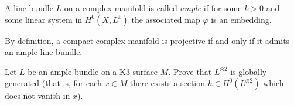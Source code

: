 \begin{definition}
\label{definition-ample}
\begin{reference}
\cite[Definition 2.3.28]{huc}
\end{reference}
A line bundle $L$ on a complex manifold is called {\it ample} if for some $k>0$
and some linear system in $H^{0}(X,L^k)$ the associated map $\varphi$ is an
embedding.
\end{definition}

\begin{slogan}
By definition, a compact complex manifold is projective if and only if it admits
an ample line bundle.
\end{slogan}

\begin{exercise}
\label{exercise-L-ample-implies-Lotimes2-globally-generated}
Let $L$ be an ample bundle on a K3 surface $M$. Prove that $L^{\otimes 2}$ is
globally generated (that is, for each $x \in M$ there exists a section $h \in
H^{0}(L^{\otimes 2})$ which does not vanish in $x$).
\end{exercise}

